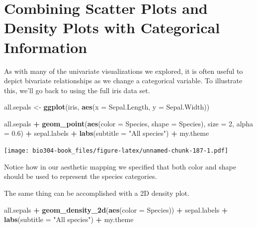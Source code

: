 \documentclass[]{book}
\newenvironment{Shaded}{\begin{snugshade}}{\end{snugshade}}
\newcommand{\DataTypeTok}[1]{\textcolor[rgb]{0.13,0.29,0.53}{#1}}
\newcommand{\DecValTok}[1]{\textcolor[rgb]{0.00,0.00,0.81}{#1}}
\newcommand{\FloatTok}[1]{\textcolor[rgb]{0.00,0.00,0.81}{#1}}
\newcommand{\KeywordTok}[1]{\textcolor[rgb]{0.13,0.29,0.53}{\textbf{#1}}}
\newcommand{\NormalTok}[1]{#1}
\newcommand{\OperatorTok}[1]{\textcolor[rgb]{0.81,0.36,0.00}{\textbf{#1}}}
\newcommand{\StringTok}[1]{\textcolor[rgb]{0.31,0.60,0.02}{#1}}
\theoremstyle{definition}
\theoremstyle{definition}
\theoremstyle{definition}
\theoremstyle{remark}
\begin{document}
\hypertarget{combining-scatter-plots-and-density-plots-with-categorical-information}{%
\section{Combining Scatter Plots and Density Plots with Categorical
Information}\label{combining-scatter-plots-and-density-plots-with-categorical-information}}

As with many of the univariate visualizations we explored, it is often
useful to depict bivariate relationships as we change a categorical
variable. To illustrate this, we'll go back to using the full iris data
set.

\begin{Shaded}
\begin{Highlighting}[]
\NormalTok{all.sepals <-}\StringTok{ }\KeywordTok{ggplot}\NormalTok{(iris, }\KeywordTok{aes}\NormalTok{(}\DataTypeTok{x =}\NormalTok{ Sepal.Length, }\DataTypeTok{y =}\NormalTok{ Sepal.Width))}

\NormalTok{all.sepals }\OperatorTok{+}\StringTok{ }
\StringTok{  }\KeywordTok{geom_point}\NormalTok{(}\KeywordTok{aes}\NormalTok{(}\DataTypeTok{color =}\NormalTok{ Species, }\DataTypeTok{shape =}\NormalTok{ Species), }\DataTypeTok{size =} \DecValTok{2}\NormalTok{, }\DataTypeTok{alpha =} \FloatTok{0.6}\NormalTok{) }\OperatorTok{+}
\StringTok{  }\NormalTok{sepal.labels }\OperatorTok{+}\StringTok{ }\KeywordTok{labs}\NormalTok{(}\DataTypeTok{subtitle =} \StringTok{"All species"}\NormalTok{) }\OperatorTok{+}
\StringTok{  }\NormalTok{my.theme}
\end{Highlighting}
\end{Shaded}

\texttt{[image: bio304-book\_files/figure-latex/unnamed-chunk-187-1.pdf]}

Notice how in our aesthetic mapping we specified that both color and
shape should be used to represent the species categories.

The same thing can be accomplished with a 2D density plot.

\begin{Shaded}
\begin{Highlighting}[]
\NormalTok{all.sepals }\OperatorTok{+}\StringTok{ }
\StringTok{  }\KeywordTok{geom_density_2d}\NormalTok{(}\KeywordTok{aes}\NormalTok{(}\DataTypeTok{color =}\NormalTok{ Species)) }\OperatorTok{+}
\StringTok{  }\NormalTok{sepal.labels }\OperatorTok{+}\StringTok{ }\KeywordTok{labs}\NormalTok{(}\DataTypeTok{subtitle =} \StringTok{"All species"}\NormalTok{) }\OperatorTok{+}
\StringTok{  }\NormalTok{my.theme}
\end{Highlighting}
\end{Shaded}
\end{document}
